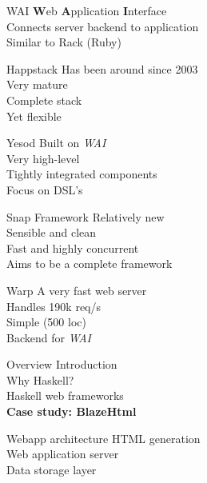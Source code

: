 \documentclass[20pt]{beamer}
\begin{document}
\begin{frame}{WAI}
    \textbf{W}eb \textbf{A}pplication \textbf{I}nterface \\
    Connects server backend to application \\
    Similar to Rack (Ruby) \\
\end{frame}

\begin{frame}{Happstack}
    Has been around since 2003 \\
    Very mature \\
    Complete stack \\
    Yet flexible
\end{frame}

\begin{frame}{Yesod}
    Built on \emph{WAI} \\
    Very high-level \\
    Tightly integrated components \\
    Focus on DSL's \\
\end{frame}

\begin{frame}{Snap Framework}
    Relatively new \\
    Sensible and clean \\
    Fast and highly concurrent \\
    Aims to be a complete framework \\
\end{frame}

\begin{frame}{Warp}
    A very fast web server \\
    Handles 190k req/s \\
    Simple (500 loc) \\
    Backend for \emph{WAI} \\
\end{frame}


\begin{frame}{Overview}
    Introduction \\
    Why Haskell? \\
    Haskell web frameworks \\
    \textbf{Case study: BlazeHtml} \\
\end{frame}

\begin{frame}{Webapp architecture}
    HTML generation \\
    Web application server \\
    Data storage layer
\end{frame}
\end{document}

